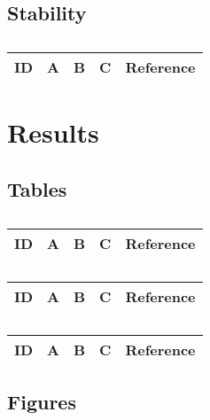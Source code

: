 \subsection{Stability}
\centering
\begin{table}[H]\footnotesize
	\caption{}
	\begin{tabular}{rp{1cm}p{2cm}p{3cm}p{1cm}}
		\hline
		ID & A & B & C & Reference \\
		\hline
		\hline
	\end{tabular}
\end{table}
\raggedright


\section{Results}


\subsection{Tables}

\centering
\begin{table}[H]\footnotesize
	\caption{}
	\begin{tabular}{rp{1cm}p{2cm}p{3cm}p{1cm}}
		\hline
		ID & A & B & C & Reference \\
		\hline
		\hline
	\end{tabular}
\end{table}
\raggedright

\centering
\begin{table}[H]\footnotesize
	\caption{}
	\begin{tabular}{rp{1cm}p{2cm}p{3cm}p{1cm}}
		\hline
		ID & A & B & C & Reference \\
		\hline
		\hline
	\end{tabular}
\end{table}
\raggedright

\centering
\begin{table}[H]\footnotesize
	\caption{}
	\begin{tabular}{rp{1cm}p{2cm}p{3cm}p{1cm}}
		\hline
		ID & A & B & C & Reference \\
		\hline
		\hline
	\end{tabular}
\end{table}
\raggedright


\subsection{Figures}

